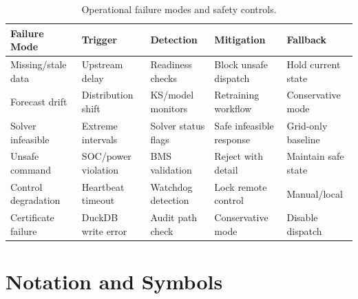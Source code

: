 \documentclass[11pt,a4paper]{article}
\begin{document}
\begin{table}[htbp]
\centering\footnotesize
\caption{Operational failure modes and safety controls.}
\label{tab:failure_modes}
\begin{tabular}{p{2.1cm}p{1.9cm}p{2.2cm}p{2.2cm}p{2.0cm}}
\toprule
Failure Mode & Trigger & Detection & Mitigation & Fallback \\
\midrule
Missing/stale data & Upstream delay & Readiness checks & Block unsafe dispatch & Hold current state \\
Forecast drift & Distribution shift & KS/model monitors & Retraining workflow & Conservative mode \\
Solver infeasible & Extreme intervals & Solver status flags & Safe infeasible response & Grid-only baseline \\
Unsafe command & SOC/power violation & BMS validation & Reject with detail & Maintain safe state \\
Control degradation & Heartbeat timeout & Watchdog detection & Lock remote control & Manual/local \\
Certificate failure & DuckDB write error & Audit path check & Conservative mode & Disable dispatch \\
\bottomrule
\end{tabular}
\end{table}

\section{Notation and Symbols}\label{app:notation}
\end{document}
